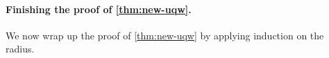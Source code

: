 \paragraph*{Finishing the proof of \cref{thm:new-uqw}.}
We now wrap up the proof of \cref{thm:new-uqw} by applying induction on the radius. 

%
